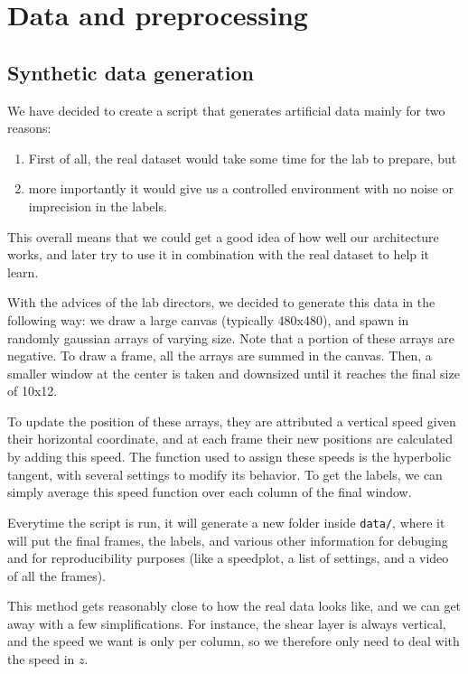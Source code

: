 \documentclass[10pt,conference]{IEEEtran}
\begin{document}
\section{Data and preprocessing}
\subsection{Synthetic data generation}
We have decided to create a script that generates artificial data mainly for two reasons: 
\begin{enumerate}
  \item First of all, the real dataset would take some time for the lab to prepare, but
  \item more importantly it would give us a controlled environment with no noise or imprecision in the labels.
\end{enumerate}
This overall means that we could get a good idea of how well our architecture works, and later try to use it in combination with the real dataset to help it learn.\par
With the advices of the lab directors, we decided to generate this data in the following way: we draw a large canvas (typically 480x480), and spawn in randomly gaussian arrays of varying size. Note that a portion of these arrays are negative. To draw a frame, all the arrays are summed in the canvas. Then, a smaller window at the center is taken and downsized until it reaches the final size of 10x12.\par
To update the position of these arrays, they are attributed a vertical speed given their horizontal coordinate, and at each frame their new positions are calculated by adding this speed. The function used to assign these speeds is the hyperbolic tangent, with several settings to modify its behavior. To get the labels, we can simply average this speed function over each column of the final window.\par
Everytime the script is run, it will generate a new folder inside \texttt{data/}, where it will put the final frames, the labels, and various other information for debuging and for reproducibility purposes (like a speedplot, a list of settings, and a video of all the frames).

This method gets reasonably close to how the real data looks like, and we can get away with a few simplifications. For instance, the shear layer is always vertical, and the speed we want is only per column, so we therefore only need to deal with the speed in $z$.
\end{document}
